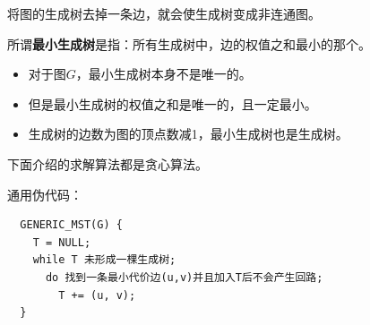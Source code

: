 \documentclass[12pt, a4paper, oneside]{ctexart}
\begin{document}
将图的生成树去掉一条边，就会使生成树变成非连通图。

所谓\textbf{最小生成树}是指：所有生成树中，边的权值之和最小的那个。

\begin{itemize}
  \item 对于图$G$，最小生成树本身不是唯一的。
  \item 但是最小生成树的权值之和是唯一的，且一定最小。
  \item 生成树的边数为图的顶点数减1，最小生成树也是生成树。
\end{itemize}

下面介绍的求解算法都是贪心算法。

通用伪代码：
\begin{lstlisting}
  GENERIC_MST(G) {
    T = NULL;
    while T 未形成一棵生成树;
      do 找到一条最小代价边(u,v)并且加入T后不会产生回路;
        T += (u, v);
  }
\end{lstlisting}
\end{document}
